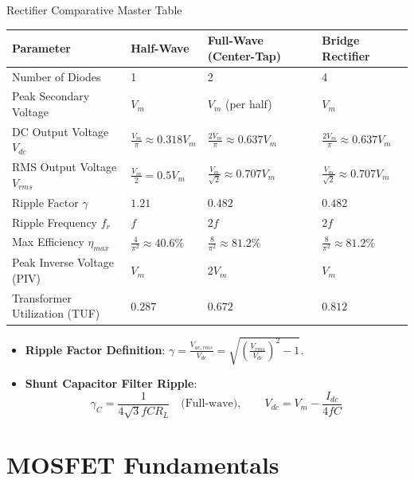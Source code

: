 \begin{formulabox}{Rectifier Comparative Master Table}
\begin{center}\small
\begin{tabularx}{\linewidth}{l X X X}
\toprule
\textbf{Parameter} & \textbf{Half-Wave} & \textbf{Full-Wave (Center-Tap)} & \textbf{Bridge Rectifier} \\
\midrule
Number of Diodes & 1 & 2 & 4 \\
Peak Secondary Voltage & $V_m$ & $V_m$ (per half) & $V_m$ \\
DC Output Voltage $V_{dc}$ & $\frac{V_m}{\pi} \approx 0.318 V_m$ & $\frac{2V_m}{\pi} \approx 0.637 V_m$ & $\frac{2V_m}{\pi} \approx 0.637 V_m$ \\
RMS Output Voltage $V_{rms}$ & $\frac{V_m}{2} = 0.5 V_m$ & $\frac{V_m}{\sqrt{2}} \approx 0.707 V_m$ & $\frac{V_m}{\sqrt{2}} \approx 0.707 V_m$ \\
Ripple Factor $\gamma$ & $1.21$ & $0.482$ & $0.482$ \\
Ripple Frequency $f_r$ & $f$ & $2f$ & $2f$ \\
Max Efficiency $\eta_{max}$ & $\frac{4}{\pi^2} \approx 40.6\%$ & $\frac{8}{\pi^2} \approx 81.2\%$ & $\frac{8}{\pi^2} \approx 81.2\%$ \\
Peak Inverse Voltage (PIV) & $V_m$ & $2V_m$ & $V_m$ \\
Transformer Utilization (TUF) & $0.287$ & $0.672$ & $0.812$ \\
\bottomrule
\end{tabularx}
\end{center}\vspace{2mm}
\begin{itemize}[leftmargin=1.5em]
    \item \textbf{Ripple Factor Definition}: $\gamma = \frac{V_{ac,rms}}{V_{dc}} = \sqrt{\left(\frac{V_{rms}}{V_{dc}}\right)^2 - 1}$.
    \item \textbf{Shunt Capacitor Filter Ripple}:
    \[ \gamma_{C} = \frac{1}{4\sqrt{3} f C R_L} \quad \text{(Full-wave)}, \qquad V_{dc} = V_m - \frac{I_{dc}}{4 f C} \]
\end{itemize}
\end{formulabox}

\section{MOSFET Fundamentals}

